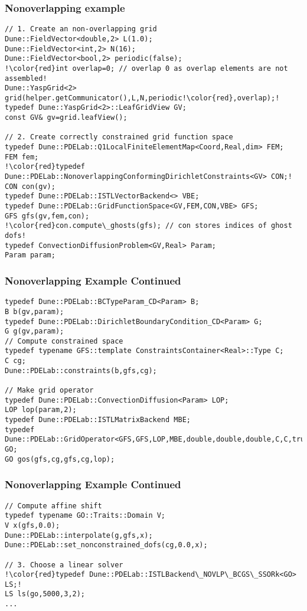 \begin{frame}[fragile]
  \frametitle{Nonoverlapping example}
  \begin{lstlisting}[breaklines=true,escapechar=!]
// 1. Create an non-overlapping grid
Dune::FieldVector<double,2> L(1.0);
Dune::FieldVector<int,2> N(16);
Dune::FieldVector<bool,2> periodic(false);
!\color{red}int overlap=0; // overlap 0 as overlap elements are not assembled!
Dune::YaspGrid<2> grid(helper.getCommunicator(),L,N,periodic!\color{red},overlap);!
typedef Dune::YaspGrid<2>::LeafGridView GV;
const GV& gv=grid.leafView();

// 2. Create correctly constrained grid function space
typedef Dune::PDELab::Q1LocalFiniteElementMap<Coord,Real,dim> FEM;
FEM fem;
!\color{red}typedef Dune::PDELab::NonoverlappingConformingDirichletConstraints<GV> CON;!
CON con(gv);
typedef Dune::PDELab::ISTLVectorBackend<> VBE;
typedef Dune::PDELab::GridFunctionSpace<GV,FEM,CON,VBE> GFS;
GFS gfs(gv,fem,con);
!\color{red}con.compute\_ghosts(gfs); // con stores indices of ghost dofs!
typedef ConvectionDiffusionProblem<GV,Real> Param;
Param param;
\end{lstlisting}
\end{frame}
\begin{frame}[fragile]
\frametitle<presentation>{Nonoverlapping Example Continued}
  \begin{lstlisting}[breaklines=true]
typedef Dune::PDELab::BCTypeParam_CD<Param> B;
B b(gv,param);
typedef Dune::PDELab::DirichletBoundaryCondition_CD<Param> G;
G g(gv,param);
// Compute constrained space
typedef typename GFS::template ConstraintsContainer<Real>::Type C;
C cg;
Dune::PDELab::constraints(b,gfs,cg);

// Make grid operator
typedef Dune::PDELab::ConvectionDiffusion<Param> LOP;
LOP lop(param,2);
typedef Dune::PDELab::ISTLMatrixBackend MBE;
typedef Dune::PDELab::GridOperator<GFS,GFS,LOP,MBE,double,double,double,C,C,true> GO;
GO gos(gfs,cg,gfs,cg,lop);
\end{lstlisting}
\end{frame}
\begin{frame}[fragile]
\frametitle<presentation>{Nonoverlapping Example Continued}
  \begin{lstlisting}[breaklines=true,escapechar=!]
// Compute affine shift
typedef typename GO::Traits::Domain V;
V x(gfs,0.0);
Dune::PDELab::interpolate(g,gfs,x);
Dune::PDELab::set_nonconstrained_dofs(cg,0.0,x);

// 3. Choose a linear solver
!\color{red}typedef Dune::PDELab::ISTLBackend\_NOVLP\_BCGS\_SSORk<GO> LS;!
LS ls(go,5000,3,2);
...
\end{lstlisting}

\end{frame}



